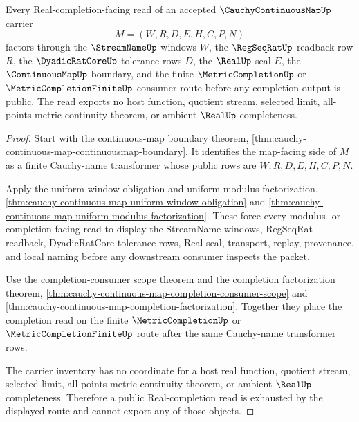 \begin{theorem}
\label{thm:cauchy-continuous-map-real-completion-scope}
Every Real-completion-facing read of an accepted $\CauchyContinuousMapUp$ carrier
$$
M=(W,R,D,E,H,C,P,N)
$$
factors through the $\StreamNameUp$ windows $W$, the $\RegSeqRatUp$ readback row $R$, the $\DyadicRatCoreUp$ tolerance rows $D$, the $\RealUp$ seal $E$, the $\ContinuousMapUp$ boundary, and the finite $\MetricCompletionUp$ or $\MetricCompletionFiniteUp$ consumer route before any completion output is public. The read exports no host function, quotient stream, selected limit, all-points metric-continuity theorem, or ambient $\RealUp$ completeness.
\end{theorem}
\begin{proof}
Start with the continuous-map boundary theorem, \autoref{thm:cauchy-continuous-map-continuousmap-boundary}. It identifies the map-facing side of $M$ as a finite Cauchy-name transformer whose public rows are $W,R,D,E,H,C,P,N$.

Apply the uniform-window obligation and uniform-modulus factorization, \autoref{thm:cauchy-continuous-map-uniform-window-obligation} and \autoref{thm:cauchy-continuous-map-uniform-modulus-factorization}. These force every modulus- or completion-facing read to display the StreamName windows, RegSeqRat readback, DyadicRatCore tolerance rows, Real seal, transport, replay, provenance, and local naming before any downstream consumer inspects the packet.

Use the completion-consumer scope theorem and the completion factorization theorem, \autoref{thm:cauchy-continuous-map-completion-consumer-scope} and \autoref{thm:cauchy-continuous-map-completion-factorization}. Together they place the completion read on the finite $\MetricCompletionUp$ or $\MetricCompletionFiniteUp$ route after the same Cauchy-name transformer rows.

The carrier inventory has no coordinate for a host real function, quotient stream, selected limit, all-points metric-continuity theorem, or ambient $\RealUp$ completeness. Therefore a public Real-completion read is exhausted by the displayed route and cannot export any of those objects.
\end{proof}

